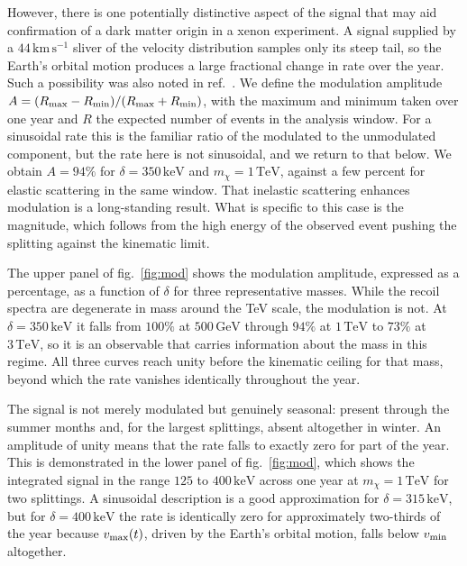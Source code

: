 \documentclass[aps,prl,twocolumn,superscriptaddress,nofootinbib,floatfix]{revtex4-2}
\newcommand{\keV}{\ensuremath{\,\mathrm{keV}}}
\newcommand{\GeV}{\ensuremath{\,\mathrm{GeV}}}
\newcommand{\TeV}{\ensuremath{\,\mathrm{TeV}}}
\newcommand{\kms}{\ensuremath{\,\mathrm{km\,s^{-1}}}}
\newcommand{\mchi}{\ensuremath{m_\chi}}
\newcommand{\vmin}{\ensuremath{v_{\rm min}}}
\begin{document}
However, there is one potentially distinctive aspect of the signal that may aid confirmation of a dark matter origin in a xenon experiment. 
A signal supplied by a $44\kms$ sliver of the velocity distribution samples only its steep tail, so the Earth's orbital motion produces a large fractional change
in rate over the year. Such a possibility was also noted in ref.~\cite{Su:2026rwz, Nomura:2026qyq,DiMauro:2026ldr}. We define the modulation amplitude $A = (R_{\rm max}-R_{\rm min})/(R_{\rm max}+R_{\rm min})$, with the maximum and minimum taken over one year and $R$ the expected number of events in the analysis window. For a sinusoidal rate this is the familiar ratio of the modulated to the unmodulated component, but the rate here is not sinusoidal, and we return to that below. We obtain $A = 94\%$ for $\delta = 350\keV$ and $\mchi = 1\TeV$, against a few percent for elastic scattering in the same window. That inelastic scattering enhances modulation is a long-standing result. What is specific to this case is the magnitude, which follows from the high energy of the observed event pushing the splitting against the kinematic limit.

The upper panel of fig.~\ref{fig:mod} shows the modulation amplitude, expressed as a percentage, as a function of $\delta$ for three representative masses. 
While the recoil spectra are degenerate in mass around the TeV scale, the modulation is not. 
At $\delta = 350\keV$ it falls from $100\%$ at $500\GeV$ through $94\%$ at $1\TeV$ to $73\%$ at
$3\TeV$, so it is an observable that carries information about the mass in this regime. 
All three curves reach unity before the kinematic ceiling for that mass, beyond which the rate vanishes identically throughout the year.

The signal is not merely modulated but genuinely seasonal: present through the summer months and, for the largest splittings, absent altogether in winter.
An amplitude of unity means that the rate falls to exactly zero for part of the year. This is demonstrated in the lower panel of fig.~\ref{fig:mod}, which shows the integrated signal in
the range $125$ to $400\keV$ across one year at $\mchi = 1\TeV$ for two splittings. A sinusoidal description is a good approximation for $\delta = 315\keV$, but for
$\delta = 400\keV$ the rate is identically zero for approximately two-thirds of the year because $v_{\rm max}(t)$, driven by the Earth's orbital motion, falls below $\vmin$ altogether.
\end{document}
